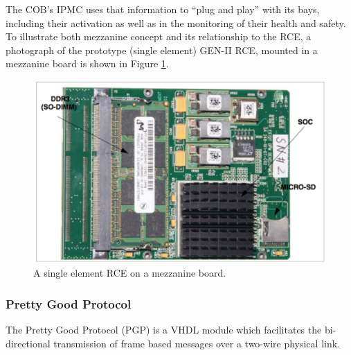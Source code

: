 The COB's IPMC uses that information to “plug and play” with its bays, including their activation as well as in the monitoring of their health and safety.
To illustrate both mezzanine concept and its relationship to the RCE, a photograph of the prototype (single element) GEN-II RCE, mounted in a mezzanine board is shown in Figure \ref{fig:mezz}.

\begin{figure}[tbh]
\includegraphics[scale=0.8]{mezzanine.pdf}
\caption{A single element RCE on a mezzanine board.}
\label{fig:mezz}
\end{figure} 


\subsubsection{Pretty Good Protocol}
\label{sec:PGP}
The Pretty Good Protocol (PGP) is a VHDL module which facilitates the bi-directional transmission of frame based messages over a two-wire physical link.      